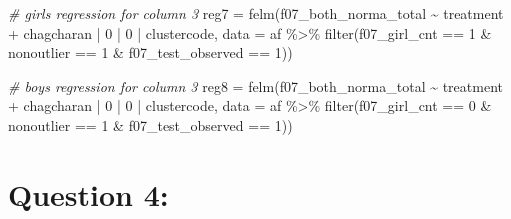 \documentclass[
]{article}
\newenvironment{Shaded}{\begin{snugshade}}{\end{snugshade}}
\newcommand{\AttributeTok}[1]{\textcolor[rgb]{0.77,0.63,0.00}{#1}}
\newcommand{\CommentTok}[1]{\textcolor[rgb]{0.56,0.35,0.01}{\textit{#1}}}
\newcommand{\DecValTok}[1]{\textcolor[rgb]{0.00,0.00,0.81}{#1}}
\newcommand{\FunctionTok}[1]{\textcolor[rgb]{0.00,0.00,0.00}{#1}}
\newcommand{\NormalTok}[1]{#1}
\newcommand{\OtherTok}[1]{\textcolor[rgb]{0.56,0.35,0.01}{#1}}
\newcommand{\SpecialCharTok}[1]{\textcolor[rgb]{0.00,0.00,0.00}{#1}}
\begin{document}
\begin{Shaded}
\begin{Highlighting}[]
\CommentTok{\# girls regression for column 3}
\NormalTok{reg7 }\OtherTok{=} \FunctionTok{felm}\NormalTok{(f07\_both\_norma\_total }\SpecialCharTok{\textasciitilde{}}\NormalTok{ treatment }\SpecialCharTok{+}\NormalTok{ chagcharan }\SpecialCharTok{|} \DecValTok{0} \SpecialCharTok{|} \DecValTok{0} \SpecialCharTok{|}\NormalTok{ clustercode, }
            \AttributeTok{data =}\NormalTok{ af }\SpecialCharTok{\%\textgreater{}\%} \FunctionTok{filter}\NormalTok{(f07\_girl\_cnt }\SpecialCharTok{==} \DecValTok{1} \SpecialCharTok{\&} 
\NormalTok{                                 nonoutlier }\SpecialCharTok{==} \DecValTok{1} \SpecialCharTok{\&}
\NormalTok{                                 f07\_test\_observed }\SpecialCharTok{==} \DecValTok{1}\NormalTok{))}

\CommentTok{\# boys regression for column 3}
\NormalTok{reg8 }\OtherTok{=} \FunctionTok{felm}\NormalTok{(f07\_both\_norma\_total }\SpecialCharTok{\textasciitilde{}}\NormalTok{ treatment }\SpecialCharTok{+}\NormalTok{ chagcharan }\SpecialCharTok{|} \DecValTok{0} \SpecialCharTok{|} \DecValTok{0} \SpecialCharTok{|}\NormalTok{ clustercode, }
            \AttributeTok{data =}\NormalTok{ af }\SpecialCharTok{\%\textgreater{}\%} \FunctionTok{filter}\NormalTok{(f07\_girl\_cnt }\SpecialCharTok{==} \DecValTok{0} \SpecialCharTok{\&} 
\NormalTok{                                 nonoutlier }\SpecialCharTok{==} \DecValTok{1} \SpecialCharTok{\&}
\NormalTok{                                 f07\_test\_observed }\SpecialCharTok{==} \DecValTok{1}\NormalTok{))}
\end{Highlighting}
\end{Shaded}

\hypertarget{question-4}{%
\section{Question 4:}\label{question-4}}
\end{document}
